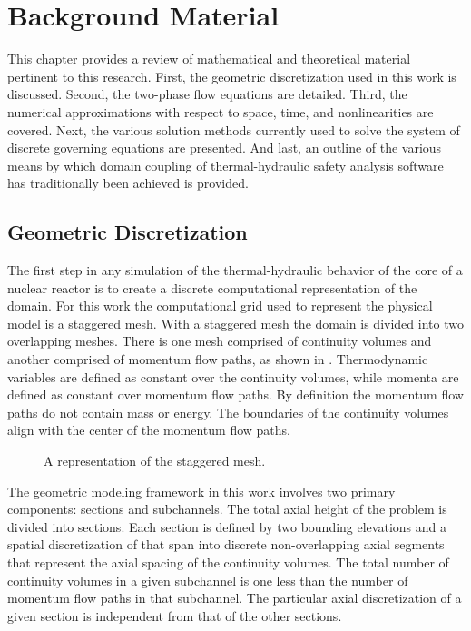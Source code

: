 \chapter{Background Material}
\label{chap:background}
This chapter provides a review of mathematical and theoretical material pertinent to this research.
First, the geometric discretization used in this work is discussed.
Second, the two-phase flow equations are detailed.
Third, the numerical approximations with respect to space, time, and nonlinearities are covered.
Next, the various solution methods currently used to solve the system of discrete governing equations are presented.
And last, an outline of the various means by which domain coupling of thermal-hydraulic safety analysis software has traditionally been achieved is provided.

\section{Geometric Discretization}
\label{sect:geometry}
The first step in any simulation of the thermal-hydraulic behavior of the core of a nuclear reactor is to create a discrete computational representation of the domain.
For this work the computational grid used to represent the physical model is a staggered mesh.
With a staggered mesh the domain is divided into two overlapping meshes.
There is one mesh comprised of continuity volumes and another comprised of momentum flow paths, as shown in .
Thermodynamic variables are defined as constant over the continuity volumes, while momenta are defined as constant over momentum flow paths.
By definition the momentum flow paths do not contain mass or energy.
The boundaries of the continuity volumes align with the center of the momentum flow paths.

\begin{figure}[ht!]
\centering

\caption{A representation of the staggered mesh.}
\label{fig:staggered_mesh}
\end{figure}

The geometric modeling framework in this work involves two primary components: sections and subchannels.
The total axial height of the problem is divided into sections.
Each section is defined by two bounding elevations and a spatial discretization of that span into discrete non-overlapping axial segments that represent the axial spacing of the continuity volumes.
The total number of continuity volumes in a given subchannel is one less than the number of momentum flow paths in that subchannel.
The particular axial discretization of a given section is independent from that of the other sections.


